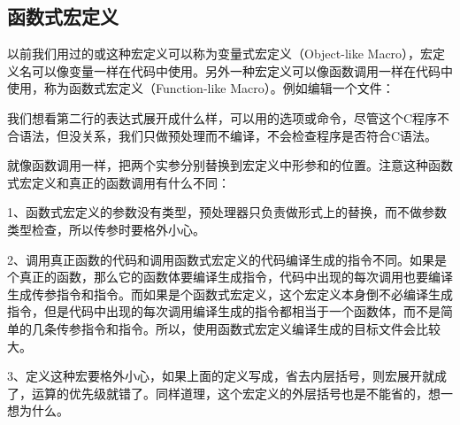 \subsection{函数式宏定义}
%


以前我们用过的或这种宏定义可以称为变量式宏定义（Object-like Macro），宏定义名可以像变量一样在代码中使用。另外一种宏定义可以像函数调用一样在代码中使用，称为函数式宏定义（Function-like Macro）。例如编辑一个文件：




我们想看第二行的表达式展开成什么样，可以用的选项或命令，尽管这个C程序不合语法，但没关系，我们只做预处理而不编译，不会检查程序是否符合C语法。




就像函数调用一样，把两个实参分别替换到宏定义中形参和的位置。注意这种函数式宏定义和真正的函数调用有什么不同：



1、函数式宏定义的参数没有类型，预处理器只负责做形式上的替换，而不做参数类型检查，所以传参时要格外小心。



2、调用真正函数的代码和调用函数式宏定义的代码编译生成的指令不同。如果是个真正的函数，那么它的函数体要编译生成指令，代码中出现的每次调用也要编译生成传参指令和指令。而如果是个函数式宏定义，这个宏定义本身倒不必编译生成指令，但是代码中出现的每次调用编译生成的指令都相当于一个函数体，而不是简单的几条传参指令和指令。所以，使用函数式宏定义编译生成的目标文件会比较大。



3、定义这种宏要格外小心，如果上面的定义写成，省去内层括号，则宏展开就成了，运算的优先级就错了。同样道理，这个宏定义的外层括号也是不能省的，想一想为什么。



